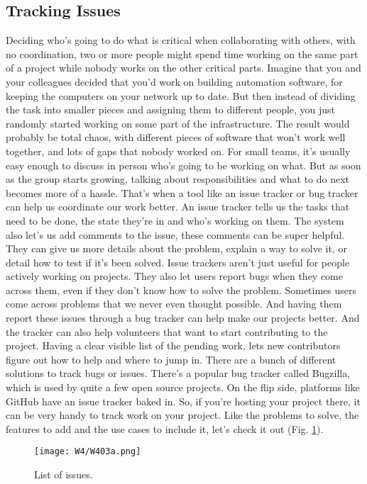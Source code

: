 	\subsection{Tracking Issues}
	
	
	Deciding who's going to do what is critical when collaborating with others, with no coordination, two or more people might spend time working on the same part of a project while nobody works on the other critical parts. Imagine that you and your colleagues decided that you'd work on building automation software, for keeping the computers on your network up to date. But then instead of dividing the task into smaller pieces and assigning them to different people, you just randomly started working on some part of the infrastructure. The result would probably be total chaos, with different pieces of software that won't work well together, and lots of gaps that nobody worked on. For small teams, it's usually easy enough to discuss in person who's going to be working on what. But as soon as the group starts growing, talking about responsibilities and what to do next becomes more of a hassle. That's when a tool like an issue tracker or bug tracker can help us coordinate our work better. An issue tracker tells us the tasks that need to be done, the state they're in and who's working on them. The system also let's us add comments to the issue, these comments can be super helpful. They can give us more details about the problem, explain a way to solve it, or detail how to test if it's been solved. Issue trackers aren't just useful for people actively working on projects. They also let users report bugs when they come across them, even if they don't know how to solve the problem. Sometimes users come across problems that we never even thought possible. And having them report these issues through a bug tracker can help make our projects better. And the tracker can also help volunteers that want to start contributing to the project. Having a clear visible list of the pending work, lets new contributors figure out how to help and where to jump in. There are a bunch of different solutions to track bugs or issues. There's a popular bug tracker called Bugzilla, which is used by quite a few open source projects. On the flip side, platforms like GitHub have an issue tracker baked in. So, if you're hosting your project there, it can be very handy to track work on your project. Like the problems to solve, the features to add and the use cases to include it, let's check it out (Fig. \ref{W403a}).

\begin{figure} 
	\caption{List of issues.}
	\centering
	\texttt{[image: W4/W403a.png]}
	\label{W403a}
\end{figure}

